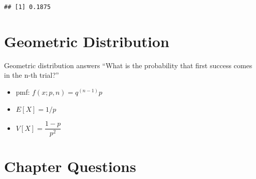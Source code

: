 \documentclass[]{book}
\theoremstyle{definition}
\theoremstyle{definition}
\theoremstyle{definition}
\theoremstyle{remark}
\begin{document}
\begin{verbatim}
## [1] 0.1875
\end{verbatim}

\hypertarget{geometric-distribution}{%
\section{Geometric Distribution}\label{geometric-distribution}}

Geometric distribution answers ``What is the probability that first
success comes in the n-th trial?''

\begin{itemize}
\item
  pmf: \(f(x;p,n) = q^{(n-1)}p\)
\item
  \(E[X] = 1/p\)
\item
  \(V[X] = \dfrac{1-p}{p^2}\)
\end{itemize}

\hypertarget{chapter-questions}{%
\section{Chapter Questions}\label{chapter-questions}}
\end{document}
